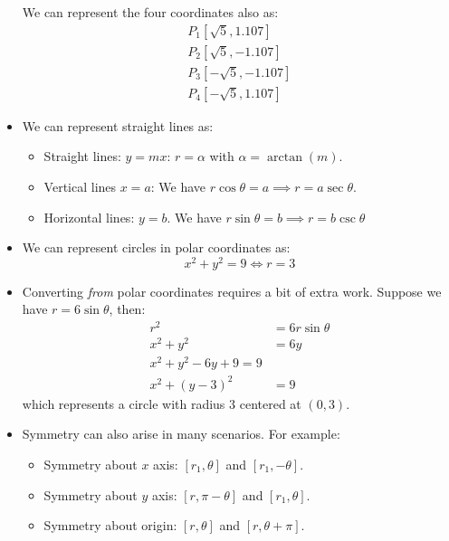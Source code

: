 \begin{itemize}
\begin{example}
\begin{center}
\begin{tikzpicture}
                \end{tikzpicture}
        \end{center}
        We can represent the four coordinates also as:
        \begin{align}
            P_1[\sqrt{5}, 1.107] \\ 
            P_2[\sqrt{5}, -1.107] \\ 
            P_3[-\sqrt{5}, -1.107] \\ 
            P_4[-\sqrt{5}, 1.107]
        \end{align}
    \end{example}
    \item We can represent straight lines as:
    \begin{itemize}
        \item Straight lines: $y=mx$: $r=\alpha$ with $\alpha=\arctan(m)$.
        \item Vertical lines $x=a$: We have $r\cos\theta = a \implies r = a\sec\theta$.
        \item Horizontal lines: $y=b$. We have $r\sin\theta=b \implies r=b\csc\theta$
    \end{itemize}
    \item We can represent circles in polar coordinates as:
    \begin{equation}
        x^2 + y^2 = 9 \iff r = 3
    \end{equation}
    \item Converting \textit{from} polar coordinates requires a bit of extra work. Suppose we have $r=6\sin\theta$, then:
    \begin{align}
        r^2 &= 6r\sin\theta \\ 
        x^2+y^2 &= 6y \\ 
        x^2+y^2-6y+9=9 \\ 
        x^2 + (y-3)^2 &= 9
    \end{align}
    which represents a circle with radius $3$ centered at $(0,3)$.
    \item Symmetry can also arise in many scenarios. For example:
    \begin{itemize}
        \item Symmetry about $x$ axis: $[r_1,\theta]$ and $[r_1, -\theta]$.
        \item Symmetry about $y$ axis: $[r, \pi-\theta]$ and $[r_1, \theta]$.
        \item Symmetry about origin: $[r,\theta]$ and $[r, \theta + \pi]$.
    \end{itemize}

\end{itemize}
